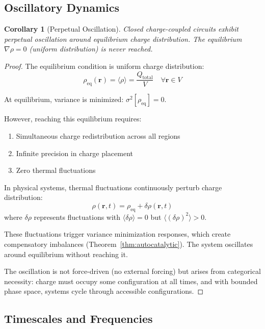 \documentclass[12pt,a4paper]{article}
\theoremstyle{plain}
\newtheorem{corollary}[theorem]{Corollary}
\theoremstyle{definition}
\theoremstyle{remark}
\begin{document}
\subsection{Oscillatory Dynamics}

\begin{corollary}[Perpetual Oscillation]
\label{cor:perpetual_oscillation}
Closed charge-coupled circuits exhibit perpetual oscillation around equilibrium charge distribution. The equilibrium $\nabla \rho = 0$ (uniform distribution) is never reached.
\end{corollary}

\begin{proof}
The equilibrium condition is uniform charge distribution:
\begin{equation}
\rho_{\text{eq}}(\mathbf{r}) = \langle \rho \rangle = \frac{Q_{\text{total}}}{V} \quad \forall \mathbf{r} \in V
\end{equation}

At equilibrium, variance is minimized: $\sigma^2[\rho_{\text{eq}}] = 0$.

However, reaching this equilibrium requires:
\begin{enumerate}
\item Simultaneous charge redistribution across all regions
\item Infinite precision in charge placement
\item Zero thermal fluctuations
\end{enumerate}

In physical systems, thermal fluctuations continuously perturb charge distribution:
\begin{equation}
\rho(\mathbf{r}, t) = \rho_{\text{eq}} + \delta \rho(\mathbf{r}, t)
\end{equation}
where $\delta \rho$ represents fluctuations with $\langle \delta \rho \rangle = 0$ but $\langle (\delta \rho)^2 \rangle > 0$.

These fluctuations trigger variance minimization responses, which create compensatory imbalances (Theorem~\ref{thm:autocatalytic}). The system oscillates around equilibrium without reaching it.

The oscillation is not force-driven (no external forcing) but arises from categorical necessity: charge must occupy some configuration at all times, and with bounded phase space, systems cycle through accessible configurations.
\end{proof}

\subsection{Timescales and Frequencies}
\end{document}
